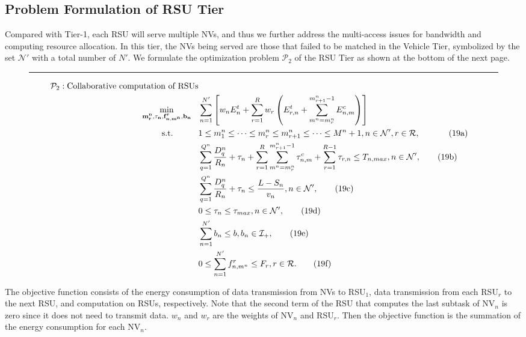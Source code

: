 \documentclass[lettersize,journal]{IEEEtran}
\begin{document}
\subsection{Problem Formulation of RSU Tier}
Compared with Tier-1, each RSU will serve multiple NVs, and thus we further address the multi-access issues for bandwidth and computing resource allocation. In this tier, the NVs being served are those that failed to be matched in the Vehicle Tier, symbolized by the set $\mathcal{N}'$ with a total number of $N'$. We formulate the optimization problem $\mathcal{P}_2$ of the RSU Tier as shown at the bottom of the next page.

\begin{figure}[!b]
\centering
\rule{52em}{0.5pt}
\begin{align*}
\mathcal{P}_2: \text{Collaborative computation of RSUs}\\
\min _{\substack { \mathbf{m^n_r} , \mathbf{\tau_n},   \mathbf{f^{r}_{n,m^n}}, \mathbf{b_n}}} \hspace{0.3cm} &\sum^{N'}_{n=1} \left[ w_n E^t_{n} + \sum_{r=1}^{R} w_r \left( E^t_{r,n} + \sum_{m^n=m_r^n}^{m_{r+1}^n-1} E^{c}_{n,m} \right) \right]\\
\text {s.t. } \hspace{0.9cm} & 1 \leq m_1^n \leq \cdots \leq m_r^n \leq m_{r+1}^n \leq \cdots \leq M^n +1, n \in \mathcal {N'}, r \in \mathcal{R}, \hspace{0.5cm} \tag{19a}\\
& \sum_{q=1}^{Q^n} \frac{D^n_q}{R_{n}} + \tau_{n}+\sum_{r=1}^{R}\sum_{m^n=m^n_r}^{m^n_{r+1}-1}\tau^{c}_{n,m} + \sum_{r=1}^{R-1}\tau_{r,n} \leq T_{n,max}, n \in \mathcal{N'}, \tag{19b}\\
& \sum_{q=1}^{Q^n} \frac{D^n_q}{R_{n}} + \tau_{n} \leq \frac{L-S_n}{v_n}, n \in \mathcal{N'}, \tag{19c}\\
& 0 \leq \tau_{n} \leq \tau_{max}, n \in \mathcal{N'}, \tag{19d}\\
& \sum_{n=1}^{N'} b_n \leq b, b_n \in \mathcal{I}_+, \tag{19e}\\
& 0 \leq \sum_{n=1}^{N'} f^{r}_{n,m^n} \leq F_r, r \in \mathcal{R}. \tag{19f}
\end{align*}
\end{figure}


The objective function consists of the energy consumption of data transmission from NVs to RSU$_1$, data transmission from each RSU$_r$ to the next RSU, and computation on RSUs, respectively. Note that the second term of the RSU that computes the last subtask of NV$_n$ is zero since it does not need to transmit data. $w_n$ and $w_r$ are the weights of NV$_n$ and RSU$_r$. Then the objective function is the summation of the energy consumption for each NV$_n$.
\end{document}
